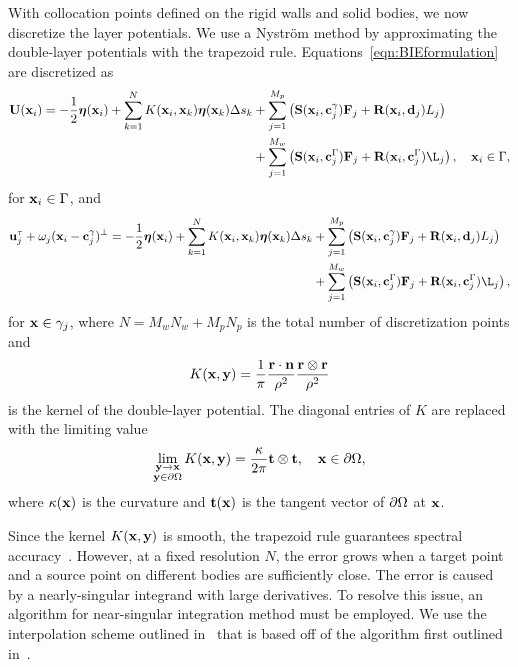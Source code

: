 \documentclass[preprint, 10pt]{elsarticle}
\begin{document}
With collocation points defined on the rigid walls and solid bodies, we
now discretize the layer potentials.  We use a Nystr\"om method by
approximating the double-layer potentials with the trapezoid rule.
Equations~\eqref{eqn:BIEformulation} are discretized as
\begin{equation*}
  \begin{aligned}
  \UU(\xx_i) = -\frac{1}{2}\eeta(\xx_i) + 
  \sum_{k=1}^{N} K(\xx_i,\xx_k) \eeta(\xx_k) \Delta s_k
    &+ \sum_{j=1}^{M_p} \left(\mathbf{S}(\xx_i,\cc^\gamma_j)\FF_j +
    \mathbf{R}(\xx_i,\dd_j)L_j\right)  \\
    &+ \sum_{j=1}^{M_w} \left(\mathbf{S}(\xx_i,\cc^\Gamma_j)\FF_j +
    \mathbf{R}(\xx_i,\cc^\Gamma_j)\L_j\right), \quad \xx_i \in \Gamma,
  \end{aligned}
\end{equation*}
for ${\mathbf{x}}_i \in \Gamma$, and
\begin{equation*}
  \begin{aligned}
\uu^\tau_j + \omega_j(\xx_i - \cc^\gamma_j)^\perp =
-\frac{1}{2}\eeta(\xx_i) +
\sum_{k=1}^{N} K(\xx_i,\xx_k) \eeta(\xx_k) \Delta s_k
    &+ \sum_{j=1}^{M_p} \left(\mathbf{S}(\xx_i,\cc^\gamma_j)\FF_j +
    \mathbf{R}(\xx_i,\dd_j)L_j\right) \\
    &+ \sum_{j=1}^{M_w} \left(\mathbf{S}(\xx_i,\cc^\Gamma_j)\FF_j +
    \mathbf{R}(\xx_i,\cc^\Gamma_j)\L_j\right),
  \end{aligned}
\end{equation*}
for ${\mathbf{x}} \in \gamma_j$, where $N = M_w N_w + M_p N_p$ is the total
number of discretization points and
\begin{align*}
  K({\mathbf{x}},{\mathbf{y}}) = \frac{1}{\pi} \frac{{\mathbf{r}} \cdot {\mathbf{n}}}{\rho^2} 
               \frac{{\mathbf{r}} \otimes {\mathbf{r}}}{\rho^2}
\end{align*}
is the kernel of the double-layer potential.  The diagonal entries of
$K$ are replaced with the limiting value
\begin{align*}
  \lim_{\substack{{\mathbf{y}} \rightarrow {\mathbf{x}} \\ {\mathbf{y}} \in {\partial}\Omega}} 
    K({\mathbf{x}},{\mathbf{y}}) = \frac{\kappa}{2\pi}{\mathbf{t}}\otimes{\mathbf{t}},
    \quad {\mathbf{x}} \in {\partial}\Omega,
\end{align*}
where $\kappa({\mathbf{x}})$ is the curvature and ${\mathbf{t}}({\mathbf{x}})$ is the tangent
vector of ${\partial}\Omega$ at ${\mathbf{x}}$.

Since the kernel $K({\mathbf{x}},{\mathbf{y}})$ is smooth, the trapezoid rule guarantees
spectral accuracy~\cite{Trefethan2014}.  However, at a fixed resolution
$N$, the error grows when a target point and a source point on different
bodies are sufficiently close.  The error is caused by a nearly-singular
integrand with large derivatives.  To resolve this issue, an algorithm
for near-singular integration method must be employed.  We use the
interpolation scheme outlined in~\cite{Quaife2014} that is based off of
the algorithm first outlined in~\cite{Ying2006}.
  
\end{document}
